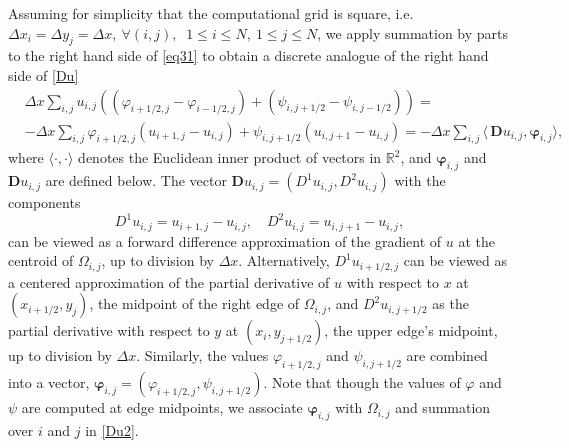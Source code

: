 \documentclass[reqno,a4paper,12pt]{amsart}
\begin{document}
Assuming for simplicity  that the computational grid is square, i.e. $\Delta x_i =\Delta y_j = \Delta x,~ \forall (i,j),$ $~1\leq i \leq N, ~1\leq j \leq N$, we apply summation by parts to the right hand side of \eqref{eq31} to obtain a discrete analogue of the right hand side of \eqref{Du}
\begin{equation}
\begin{aligned}
  &\Delta x \sum_{i,j} u_{i,j} \left((\varphi_{i+1/2,j} - \varphi_{i-1/2,j})  + (\psi_{i,j+1/2} - \psi_{i,j-1/2}) \right) = \\ &-\Delta x \sum_{i,j} \varphi_{i+1/2,j} (u_{i+1,j} - u_{i,j}) + \psi_{i,j+1/2} (u_{i,j+1} - u_{i,j}) = -\Delta x \sum_{i,j} \langle\, \bm{D}u_{i,j},
\bm{\varphi}_{i,j} \rangle,
   \label{Du2}
\end{aligned}
\end{equation}
where  $\langle\cdot,\cdot\rangle$ denotes the Euclidean inner product of vectors in $\mathbb{R}^2$, and $\bm{\varphi}_{i,j}$  and $\bm{D}u_{i,j}$ are defined below. The vector $\bm{D}u_{i,j} = (D^1u_{i,j}, D^2u_{i,j})$  with the components 
\begin{equation}
    D^1u_{i,j} = u_{i+1,j}-u_{i,j}, \quad  D^2u_{i,j} = u_{i,j+1}-u_{i,j},
    \label{eq30}
\end{equation}
can be viewed as a forward difference approximation of the gradient of $u$ at the centroid of $\Omega_{i,j}$, up to division by $\Delta x$. Alternatively, $D^1u_{i+1/2,j}$ can be viewed as a centered approximation of the partial derivative of $u$ with respect to $x$ at $(x_{i+1/2}, y_{j})$, the midpoint of the right edge of $\Omega_{i,j}$,  and $D^2u_{i,j+1/2}$ as the partial derivative with respect to $y$ at $(x_{i}, y_{j+1/2})$, the upper edge's midpoint, up to division by $\Delta x$. Similarly, the values $\varphi_{i+1/2,j}$ and $\psi_{i,j+1/2}$ are combined into a vector, $\bm{\varphi}_{i,j}=(\varphi_{i+1/2,j}, \psi_{i,j+1/2})$. Note that though the values of $\varphi$ and $\psi$ are computed at edge midpoints, we associate $\bm{\varphi}_{i,j}$ with $\Omega_{i,j}$ and summation over $i$ and $j$ in \eqref{Du2}. 

\end{document}
